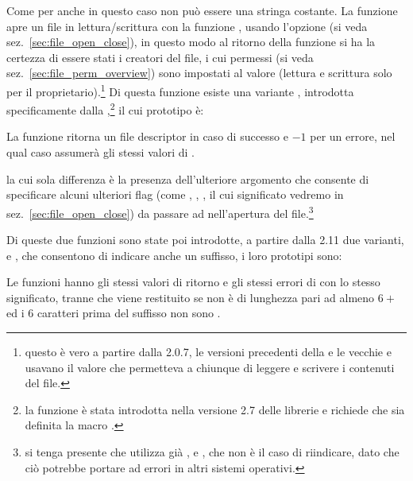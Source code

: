 Come per  anche in questo caso  non può essere
una stringa costante. La funzione apre un file in lettura/scrittura con la
funzione , usando l'opzione  (si veda
sez.~\ref{sec:file_open_close}), in questo modo al ritorno della funzione si
ha la certezza di essere stati i creatori del file, i cui permessi (si veda
sez.~\ref{sec:file_perm_overview}) sono impostati al valore 
(lettura e scrittura solo per il proprietario).\footnote{questo è vero a
  partire dalla  2.0.7, le versioni precedenti della  e
  le vecchie  e  usavano il valore  che
  permetteva a chiunque di leggere e scrivere i contenuti del file.}  Di
questa funzione esiste una variante , introdotta
specificamente dalla ,\footnote{la funzione è stata introdotta
  nella versione 2.7 delle librerie e richiede che sia definita la macro
  .} il cui prototipo è:

\begin{funcproto}{
}
{La funzione ritorna un file descriptor in caso di successo e $-1$ per un
  errore, nel qual caso  assumerà  gli stessi valori di
  .} 
\end{funcproto}
\noindent la cui sola differenza è la presenza dell'ulteriore argomento
 che consente di specificare alcuni ulteriori flag (come
, , , il cui significato
vedremo in sez.~\ref{sec:file_open_close}) da passare ad 
nell'apertura del file.\footnote{si tenga presente che 
  utilizza già ,  e , che non è
  il caso di riindicare, dato che ciò potrebbe portare ad errori in altri
  sistemi operativi.}

Di queste due funzioni sono state poi introdotte, a partire dalla 
2.11 due varianti,  e , che consentono di
indicare anche un suffisso, i loro prototipi sono:

\begin{funcproto}{
}

{Le funzioni hanno gli stessi valori di ritorno e gli stessi errori di
   con lo stesso significato, tranne  che viene
  restituito se  non è di lunghezza pari ad almeno
  $6+$ ed i 6 caratteri prima del suffisso non sono
  .}
\end{funcproto}

